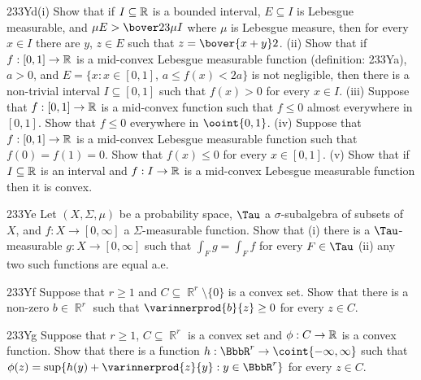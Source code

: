 {\spheader 233Yd(i) Show that if $I\subseteq\Bbb R$ is a bounded
interval, $E\subseteq I$ is Lebesgue measurable, and
$\mu E>\bover23\mu I$ where $\mu$ is Lebesgue measure, then for every
$x\in I$ there are $y$, $z\in E$ such that $z=\bover{x+y}2$.      (ii) Show that if
$f:[0,1]\to\Bbb R$ is a mid-convex Lebesgue measurable function
(definition:  233Ya), $a>0$, and $E=\{x:x\in[0,1]$, $a\le f(x)<2a\}$ is
not negligible, then there is a non-trivial interval $I\subseteq[0,1]$
such that $f(x)>0$ for every $x\in I$.      (iii) Suppose
that $f:[0,1]\to\Bbb R$ is a mid-convex function such that $f\le 0$
almost everywhere in $[0,1]$.   Show that $f\le 0$ everywhere in
$\ooint{0,1}$.   
(iv) Suppose that $f:[0,1]\to\Bbb R$ is a mid-convex Lebesgue measurable
function such that $f(0)=f(1)=0$.   Show that $f(x)\le 0$ for every
$x\in[0,1]$.   
(v) Show that if $I\subseteq\Bbb R$ is an interval and $f:I\to\Bbb R$ is
a mid-convex Lebesgue measurable function then it is convex.

\spheader 233Ye Let $(X,\Sigma,\mu)$ be a probability space, $\Tau$ a
$\sigma$-subalgebra of subsets of $X$, and $f:X\to[0,\infty]$ a
$\Sigma$-measurable function.   Show that (i) there is a $\Tau$-measurable
$g:X\to[0,\infty]$ such that $\int_Fg=\int_Ff$ for every $F\in\Tau$
(ii) any two such functions are equal a.e.

\spheader 233Yf Suppose that $r\ge 1$ and $C\subseteq\BbbR^r\setminus\{0\}$
is a convex set.   Show that there is a non-zero $b\in\BbbR^r$ 
such that $\varinnerprod{b}{z}\ge 0$ for every $z\in C$.

\spheader 233Yg Suppose that $r\ge 1$, $C\subseteq\BbbR^r$ is a convex set
and $\phi:C\to\Bbb R$ is a convex function.   Show that there is a function
$h:\BbbR^r\to\coint{-\infty,\infty}$ such that
$\phi(z)=\sup\{h(y)+\varinnerprod{z}{y}:y\in\BbbR^r\}$ for every $z\in C$.

}
